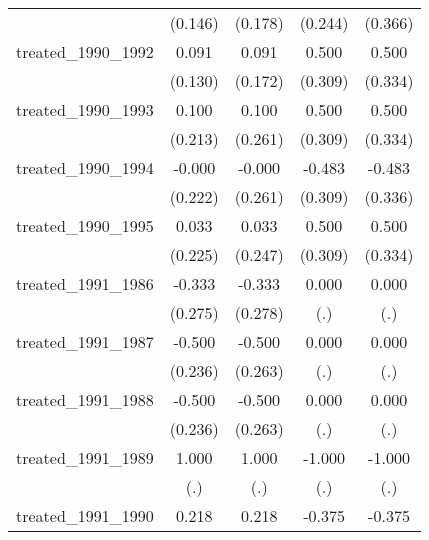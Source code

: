{\begin{tabular}{l*{4}{c}}
            &     (0.146)         &     (0.178)         &     (0.244)         &     (0.366)         \\
[1em]
treated\_1990\_1992&       0.091         &       0.091         &       0.500         &       0.500         \\
            &     (0.130)         &     (0.172)         &     (0.309)         &     (0.334)         \\
[1em]
treated\_1990\_1993&       0.100         &       0.100         &       0.500         &       0.500         \\
            &     (0.213)         &     (0.261)         &     (0.309)         &     (0.334)         \\
[1em]
treated\_1990\_1994&      -0.000         &      -0.000         &      -0.483         &      -0.483         \\
            &     (0.222)         &     (0.261)         &     (0.309)         &     (0.336)         \\
[1em]
treated\_1990\_1995&       0.033         &       0.033         &       0.500         &       0.500         \\
            &     (0.225)         &     (0.247)         &     (0.309)         &     (0.334)         \\
[1em]
treated\_1991\_1986&      -0.333         &      -0.333         &       0.000         &       0.000         \\
            &     (0.275)         &     (0.278)         &         (.)         &         (.)         \\
[1em]
treated\_1991\_1987&      -0.500\sym{*}  &      -0.500         &       0.000         &       0.000         \\
            &     (0.236)         &     (0.263)         &         (.)         &         (.)         \\
[1em]
treated\_1991\_1988&      -0.500\sym{*}  &      -0.500         &       0.000         &       0.000         \\
            &     (0.236)         &     (0.263)         &         (.)         &         (.)         \\
[1em]
treated\_1991\_1989&       1.000         &       1.000         &      -1.000         &      -1.000         \\
            &         (.)         &         (.)         &         (.)         &         (.)         \\
[1em]
treated\_1991\_1990&       0.218\sym{*}  &       0.218         &      -0.375\sym{**} &      -0.375\sym{*}  \\

\end{tabular}}
